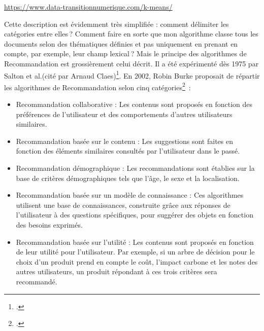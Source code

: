 \begin{center}
	\url{https://www.data-transitionnumerique.com/k-means/}   
\end{center}

Cette description est évidemment très simplifiée : comment délimiter les catégories entre elles ? Comment faire en sorte que mon algorithme classe tous les documents selon des thématiques définies et pas uniquement en prenant en compte, par exemple, leur champ lexical ? Mais le principe des algorithmes de Recommandation est grossièrement celui décrit. Il a été expérimenté dès 1975 par Salton et al.(cité par Arnaud Claes)\footcite[p. 38]{claes2022}. En 2002, Robin Burke proposait de répartir les algorithmes de Recommandation selon cinq catégories\footcite{claes2022} :

\begin{itemize}
	\item Recommandation collaborative : Les contenus sont proposés en fonction des préférences de l’utilisateur et des comportements d’autres utilisateurs similaires.
	\item Recommandation basée sur le contenu : Les suggestions sont faites en fonction des éléments similaires consultés par l’utilisateur dans le passé.
	\item Recommandation démographique : Les recommandations sont établies sur la base de critères démographiques tels que l’âge, le sexe et la localisation.
	\item Recommandation basée sur un modèle de connaissance : Ces algorithmes utilisent une base de connaissances, construite grâce aux réponses de l’utilisateur à des questions spécifiques, pour suggérer des objets en fonction des besoins exprimés.
	\item Recommandation basée sur l’utilité : Les contenus sont proposés en fonction de leur utilité pour l’utilisateur. Par exemple, si un arbre de décision pour le choix d’un produit prend en compte le coût, l’impact carbone et les notes des autres utilisateurs, un produit répondant à ces trois critères sera recommandé.
\end{itemize}

